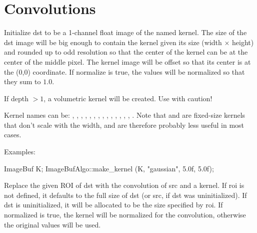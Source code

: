 \section{Convolutions}
\label{sec:iba:convolutions}

 
Initialize {\cf dst} to be a 1-channel {\cf float} image of the named kernel.
The size of the {\cf dst} image will be big enough to contain the kernel
given its size ({\cf width} $\times$ {\cf height})
and rounded up to odd resolution so
that the center of the kernel can be at the center of the middle
pixel.  The kernel image will be offset so that its center is at the
{\cf (0,0)} coordinate.  If {\cf normalize} is true, the values will be
normalized so that they sum to $1.0$.

If {\cf depth} $> 1$, a volumetric kernel will be created.  Use with
caution!

Kernel names can be: , , ,
, , , ,
, , , , ,
, , . Note that
 and  are fixed-size kernels that don't
scale with the width, and are therefore probably less useful in most
cases.

\smallskip
\noindent Examples:
\begin{code}
    ImageBuf K;
    ImageBufAlgo::make_kernel (K, "gaussian", 5.0f, 5.0f);
\end{code}
\apiend

 
Replace the given ROI of {\cf dst} with the convolution of {\cf src} and
a kernel.  If {\cf roi} is not defined, it defaults to the full size
of {\cf dst} (or {\cf src}, if {\cf dst} was uninitialized).
If {\cf dst} is uninitialized,
it will be allocated to be the size specified by {\cf roi}.  If 
{\cf normalized} is {\cf true}, the kernel will be normalized for the 
convolution, otherwise the original values will be used.

